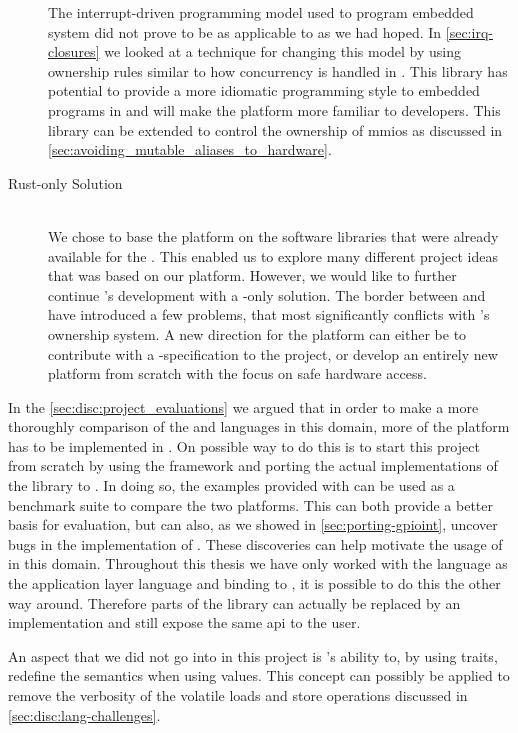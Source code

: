 \begin{description}
  The interrupt-driven programming model used to program embedded system did not prove to be as applicable to {\rust} as we had hoped.
  In \autoref{sec:irq-closures} we looked at a technique for changing this model by using ownership rules similar to how concurrency is handled in {\rust}.
  This library has potential to provide a more idiomatic programming style to embedded programs in {\rust} and will make the platform more familiar to {\rust} developers.
  This library can be extended to control the ownership of \glspl{mmio} as discussed in \autoref{sec:avoiding_mutable_aliases_to_hardware}.

\item[Rust-only Solution] \hfill \\
  We chose to base the {\rg} platform on the software libraries that were already available for the {\gecko}.
  This enabled us to explore many different project ideas that was based on our platform.
  However, we would like to further continue {\rg}'s development with a {\rust}-only solution.
  The border between {\rust} and {\C} have introduced a few problems, that most significantly conflicts with {\rust}'s ownership system.
  A new direction for the platform can either be to contribute with a {\gecko}-specification to the {\zinc} project, or develop an entirely new platform from scratch with the focus on safe hardware access.

\end{description}





In the \autoref{sec:disc:project_evaluations} we argued that in order to make a more thoroughly comparison of the {\C} and {\rust} languages in this domain, more of the platform has to be implemented in {\rust}.
On possible way to do this is to start this project from scratch by using the  framework and porting the actual implementations of the {\emlib} library to {\rust}.
In doing so, the examples provided with {\emlib} can be used as a benchmark suite to compare the two platforms.
This can both provide a better basis for evaluation, but can also, as we showed in \autoref{sec:porting-gpioint}, uncover bugs in the {\C} implementation of {\emlib}.
These discoveries can help motivate the usage of {\rust} in this domain.
Throughout this thesis we have only worked with the {\rust} language as the application layer language and binding to {\C}, it is possible to do this the other way around.
Therefore parts of the {\emlib} library can actually be replaced by an {\rust} implementation and still expose the same \gls{api} to the user.

An aspect that we did not go into in this project is {\rust}'s ability to, by using traits, redefine the semantics when using values.
This concept can possibly be applied to remove the verbosity of the volatile loads and store operations discussed in \autoref{sec:disc:lang-challenges}.
